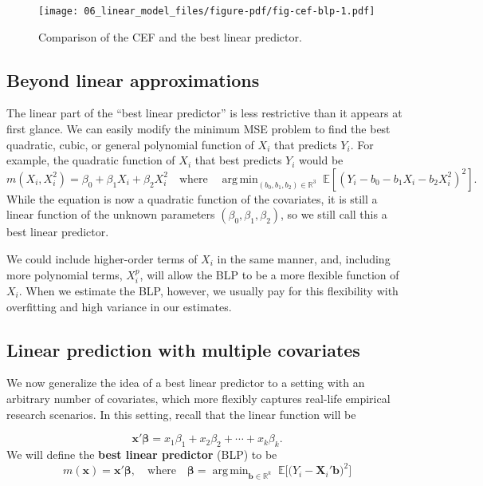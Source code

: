 \documentclass[
  letterpaper,
  DIV=11,
  numbers=noendperiod]{scrreprt}
\newcommand{\mb}{\symbf}
\newcommand{\E}{\mathbb{E}}
\newcommand{\real}{\mathbb{R}}
\newcommand{\bfx}{\mb{x}}
\newcommand{\bfbeta}{\mb{\beta}}
\DeclareMathOperator*{\argmin}{arg\,min}
\theoremstyle{plain}
\theoremstyle{definition}
\theoremstyle{definition}
\theoremstyle{remark}
\begin{document}
\begin{figure}[th]

{\centering \texttt{[image: 06\_linear\_model\_files/figure-pdf/fig-cef-blp-1.pdf]}

}

\caption{\label{fig-cef-blp}Comparison of the CEF and the best linear
predictor.}

\end{figure}

\hypertarget{beyond-linear-approximations}{%
\subsection{Beyond linear
approximations}\label{beyond-linear-approximations}}

The linear part of the ``best linear predictor'' is less restrictive
than it appears at first glance. We can easily modify the minimum MSE
problem to find the best quadratic, cubic, or general polynomial
function of \(X_i\) that predicts \(Y_i\). For example, the quadratic
function of \(X_i\) that best predicts \(Y_i\) would be \[ 
m(X_i, X_i^2) = \beta_0 + \beta_1X_i + \beta_2X_i^2 \quad\text{where}\quad \argmin_{(b_0,b_1,b_2) \in \mathbb{R}^3}\;\E[(Y_{i} - b_{0} - b_{1}X_{i} - b_{2}X_{i}^{2})^{2}].
\] While the equation is now a quadratic function of the covariates, it
is still a linear function of the unknown parameters
\((\beta_{0}, \beta_{1}, \beta_{2})\), so we still call this a best
linear predictor.

We could include higher-order terms of \(X_i\) in the same manner, and,
including more polynomial terms, \(X_i^p\), will allow the BLP to be a
more flexible function of \(X_i\). When we estimate the BLP, however, we
usually pay for this flexibility with overfitting and high variance in
our estimates.

\hypertarget{linear-prediction-with-multiple-covariates}{%
\subsection{Linear prediction with multiple
covariates}\label{linear-prediction-with-multiple-covariates}}

We now generalize the idea of a best linear predictor to a setting with
an arbitrary number of covariates, which more flexibly captures
real-life empirical research scenarios. In this setting, recall that the
linear function will be

\[ 
\bfx'\bfbeta = x_{1}\beta_{1} + x_{2}\beta_{2} + \cdots + x_{k}\beta_{k}.
\] We will define the \textbf{best linear predictor} (BLP) to be \[ 
m(\bfx) = \bfx'\bfbeta, \quad \text{where}\quad \bfbeta = \argmin_{\mb{b} \in \real^k}\; \E\bigl[ \bigl(Y_{i} - \mb{X}_{i}'\mb{b} \bigr)^2\bigr]
\]
\end{document}
